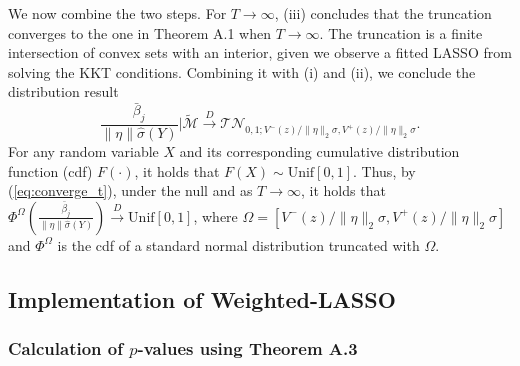 \documentclass[11pt]{article}
\newcommand{\CD}{\stackrel{D}{\rightarrow}}
\begin{document}
	We now combine the two steps. For $T\to\infty$, (iii) concludes that the truncation converges to the one in Theorem A.1 when $T\to\infty$. The truncation is a finite intersection of convex sets with an interior, given we observe a fitted LASSO from solving the KKT conditions. Combining it with (i) and (ii), we conclude the distribution result
	\begin{equation}\label{eq:converge_t}
		\frac{\bar{\beta}_j}{\|\eta\|\hat{\sigma}(Y)}| \tilde{\mathcal{M}}\CD\mathcal{TN}_{0,1;V^{-}(z)/\|\eta\|_2\sigma,V^{+}(z)/\|\eta\|_2\sigma}.
	\end{equation}
	For any random variable $X$ and its corresponding cumulative distribution function (cdf) $F(\cdot)$, it holds that $F(X)\sim \text{Unif}[0,1]$. Thus, by (\ref{eq:converge_t}), under the null and as $T\to\infty$, it holds that $\Phi^{\Omega}( \frac{\bar{\beta}_j}{\|\eta\|\hat{\sigma}(Y)})\CD \textrm{Unif}[0,1]$, where $\Omega=[V^{-}(z)/\|\eta\|_2\sigma,V^{+}(z)/\|\eta\|_2\sigma]$ and $\Phi^{\Omega}$ is the cdf of a standard normal distribution truncated with $\Omega$.
	
	


\subsection{Implementation of Weighted-LASSO}

\subsubsection*{Calculation of $p$-values using Theorem A.3}
\end{document}
